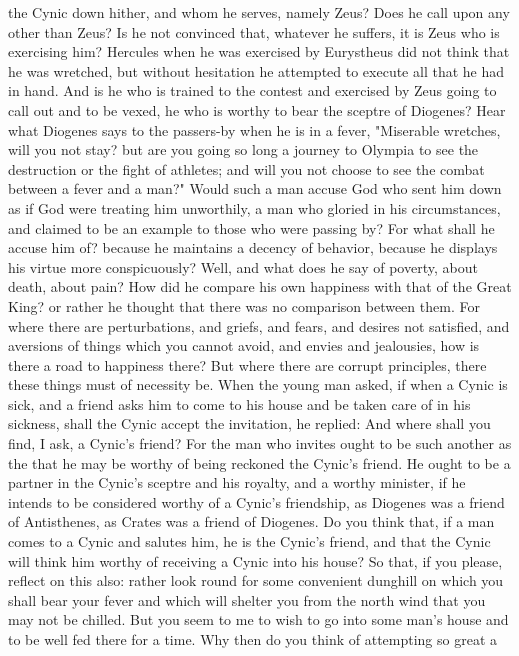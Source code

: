 \documentclass[a4paper]{article}
\begin{document}
the Cynic down hither, and whom he serves, namely Zeus? Does he call upon any
other than Zeus? Is he not convinced that, whatever he suffers, it is Zeus who
is exercising him? Hercules when he was exercised by Eurystheus did not think
that he was wretched, but without hesitation he attempted to execute all that
he had in hand. And is he who is trained to the contest and exercised by Zeus
going to call out and to be vexed, he who is worthy to bear the sceptre of
Diogenes? Hear what Diogenes says to the passers-by when he is in a fever,
"Miserable wretches, will you not stay? but are you going so long a journey to
Olympia to see the destruction or the fight of athletes; and will you not
choose to see the combat between a fever and a man?" Would such a man accuse
God who sent him down as if God were treating him unworthily, a man who gloried
in his circumstances, and claimed to be an example to those who were passing
by? For what shall he accuse him of? because he maintains a decency of
behavior, because he displays his virtue more conspicuously? Well, and what
does he say of poverty, about death, about pain? How did he compare his own
happiness with that of the Great King? or rather he thought that there was no
comparison between them. For where there are perturbations, and griefs, and
fears, and desires not satisfied, and aversions of things which you cannot
avoid, and envies and jealousies, how is there a road to happiness there? But
where there are corrupt principles, there these things must of necessity be.
    When the young man asked, if when a Cynic is sick, and a friend asks him to
come to his house and be taken care of in his sickness, shall the Cynic accept
the invitation, he replied: And where shall you find, I ask, a Cynic's friend?
For the man who invites ought to be such another as the that he may be worthy
of being reckoned the Cynic's friend. He ought to be a partner in the Cynic's
sceptre and his royalty, and a worthy minister, if he intends to be considered
worthy of a Cynic's friendship, as Diogenes was a friend of Antisthenes, as
Crates was a friend of Diogenes. Do you think that, if a man comes to a Cynic
and salutes him, he is the Cynic's friend, and that the Cynic will think him
worthy of receiving a Cynic into his house? So that, if you please, reflect on
this also: rather look round for some convenient dunghill on which you shall
bear your fever and which will shelter you from the north wind that you may not
be chilled. But you seem to me to wish to go into some man's house and to be
well fed there for a time. Why then do you think of attempting so great a
\end{document}
